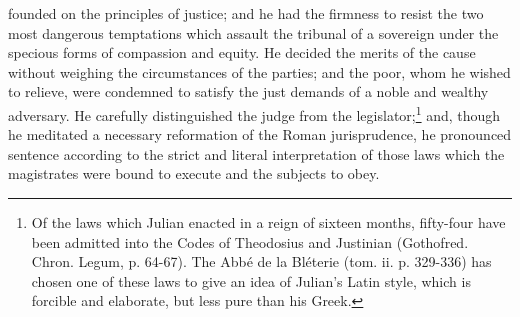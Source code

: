founded on the principles of justice; and he had the firmness to resist the two most dangerous temptations which assault the tribunal of a sovereign under the specious forms of compassion and equity. He decided the merits of the cause without weighing the circumstances of the parties; and the poor, whom he wished to relieve, were condemned to satisfy the just demands of a noble and wealthy adversary. He carefully distinguished the judge from the legislator;\footnote{Of the laws which Julian enacted in a reign of sixteen months, fifty-four have been admitted into the Codes of Theodosius and Justinian (Gothofred. Chron. Legum, p. 64-67). The Abbé de la Bléterie (tom. ii. p. 329-336) has chosen one of these laws to give an idea of Julian\texthebrew{}’s Latin style, which is forcible and elaborate, but less pure than his Greek.} and, though he meditated a necessary reformation of the Roman jurisprudence, he pronounced sentence according to the strict and literal interpretation of those laws which the magistrates were bound to execute and the subjects to obey.

